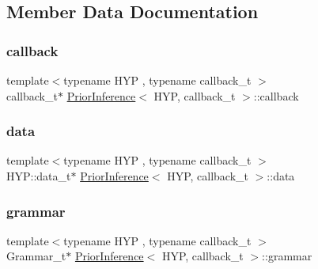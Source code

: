 \subsection{Member Data Documentation}
\mbox{\label{class_prior_inference_a0b71e0bf3b2c27fa97be006a3c3738a0}} 
\subsubsection{\texorpdfstring{callback}{callback}}
{\footnotesize\ttfamily template$<$typename H\+YP , typename callback\+\_\+t $>$ \\
callback\+\_\+t$\ast$ \hyperlink{class_prior_inference}{Prior\+Inference}$<$ H\+YP, callback\+\_\+t $>$\+::callback}

\mbox{\label{class_prior_inference_a537a489d953992aca5327899548df8ac}} 
\subsubsection{\texorpdfstring{data}{data}}
{\footnotesize\ttfamily template$<$typename H\+YP , typename callback\+\_\+t $>$ \\
H\+Y\+P\+::data\+\_\+t$\ast$ \hyperlink{class_prior_inference}{Prior\+Inference}$<$ H\+YP, callback\+\_\+t $>$\+::data}

\mbox{\label{class_prior_inference_abafbe828a4c4a98d3828c65e9826fab6}} 
\subsubsection{\texorpdfstring{grammar}{grammar}}
{\footnotesize\ttfamily template$<$typename H\+YP , typename callback\+\_\+t $>$ \\
Grammar\+\_\+t$\ast$ \hyperlink{class_prior_inference}{Prior\+Inference}$<$ H\+YP, callback\+\_\+t $>$\+::grammar}

\mbox{\label{class_prior_inference_ab5732461e8c514eebc2c29b3d19e4cd1}} 

